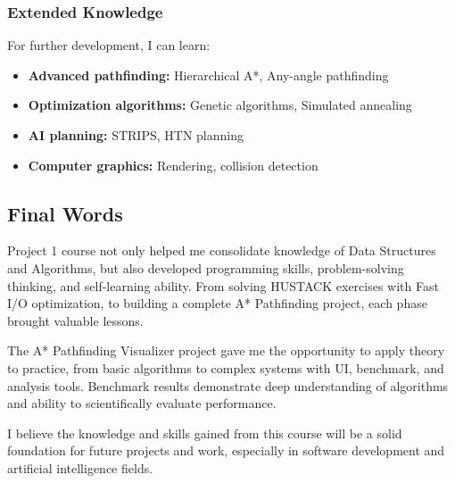 \documentclass[12pt,a4paper]{article}
\begin{document}
\subsubsection{Extended Knowledge}
For further development, I can learn:
\begin{itemize}
    \item \textbf{Advanced pathfinding:} Hierarchical A*, Any-angle pathfinding
    \item \textbf{Optimization algorithms:} Genetic algorithms, Simulated annealing
    \item \textbf{AI planning:} STRIPS, HTN planning
    \item \textbf{Computer graphics:} Rendering, collision detection
\end{itemize}

\subsection{Final Words}
Project 1 course not only helped me consolidate knowledge of Data Structures and Algorithms, but also developed programming skills, problem-solving thinking, and self-learning ability. From solving HUSTACK exercises with Fast I/O optimization, to building a complete A* Pathfinding project, each phase brought valuable lessons.

The A* Pathfinding Visualizer project gave me the opportunity to apply theory to practice, from basic algorithms to complex systems with UI, benchmark, and analysis tools. Benchmark results demonstrate deep understanding of algorithms and ability to scientifically evaluate performance.

I believe the knowledge and skills gained from this course will be a solid foundation for future projects and work, especially in software development and artificial intelligence fields.
\end{document}
